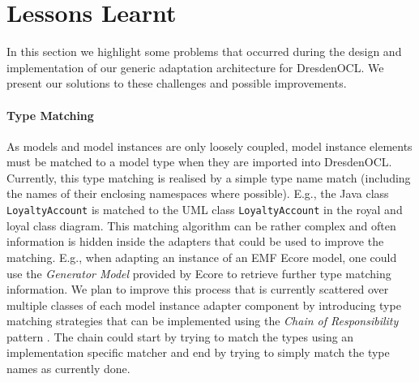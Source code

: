 \section{Lessons Learnt}
\label{sec:lessons}

  In this section we highlight some problems that occurred during the design
  and implementation of our generic adaptation architecture for DresdenOCL.
  We present our solutions to these challenges and possible improvements.

	\paragraph{Type Matching}
	As models and model instances are only loosely 
	coupled, model instance elements must be matched to a model type
	when they are imported into DresdenOCL. Currently, this type matching is realised by a simple type name match (including the names of 
	their enclosing namespaces where possible). E.g., the Java class \texttt{LoyaltyAccount} is
	matched to the UML class \texttt{LoyaltyAccount} in the royal and loyal class diagram.
	This matching algorithm can be rather complex and often information is hidden inside the adapters that could be 
	used to improve the matching. E.g., when adapting an instance of an EMF 
	Ecore model, one could use the \emph{Generator Model} provided by Ecore to
	retrieve further type matching information. We plan to improve this process
	that is currently scattered over multiple classes of each model instance 
	adapter component by introducing type matching strategies that 
	can be implemented using the \emph{Chain of Responsibility} 
	pattern \cite{gamma:dp}. The chain could start by trying to match the 
	types using an implementation specific matcher and end by trying to 
	simply match the type names as currently done.
	
